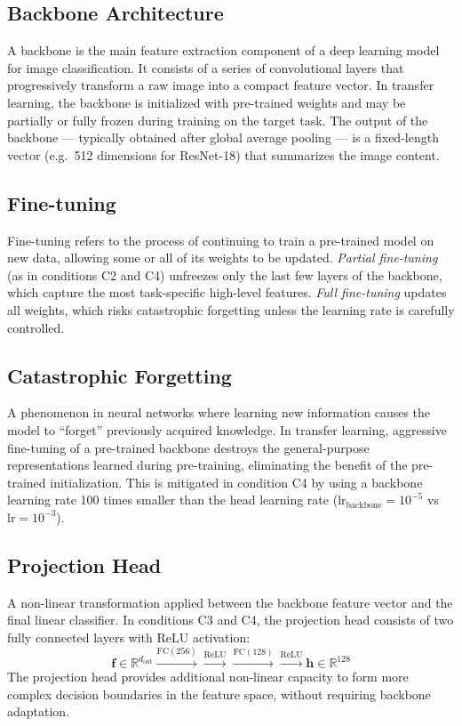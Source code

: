 \documentclass[12pt, a4paper]{article}
\begin{document}
\subsection{Backbone Architecture}

A backbone is the main feature extraction component of a deep learning
model for image classification.
It consists of a series of convolutional layers that progressively
transform a raw image into a compact feature vector.
In transfer learning, the backbone is initialized with pre-trained weights
and may be partially or fully frozen during training on the target task.
The output of the backbone --- typically obtained after global average
pooling --- is a fixed-length vector (e.g.\ 512 dimensions for ResNet-18)
that summarizes the image content.

\subsection{Fine-tuning}

Fine-tuning refers to the process of continuing to train a pre-trained
model on new data, allowing some or all of its weights to be updated.
\textit{Partial fine-tuning} (as in conditions C2 and C4) unfreezes
only the last few layers of the backbone, which capture the most
task-specific high-level features.
\textit{Full fine-tuning} updates all weights, which risks
catastrophic forgetting unless the learning rate is carefully controlled.

\subsection{Catastrophic Forgetting}

A phenomenon in neural networks where learning new information
causes the model to ``forget'' previously acquired knowledge.
In transfer learning, aggressive fine-tuning of a pre-trained backbone
destroys the general-purpose representations learned during pre-training,
eliminating the benefit of the pre-trained initialization.
This is mitigated in condition C4 by using a backbone learning rate
100 times smaller than the head learning rate
($\text{lr}_\text{backbone} = 10^{-5}$ vs $\text{lr} = 10^{-3}$).

\subsection{Projection Head}

A non-linear transformation applied between the backbone feature vector
and the final linear classifier.
In conditions C3 and C4, the projection head consists of two fully
connected layers with ReLU activation:
\[
  \mathbf{f} \in \mathbb{R}^{d_\text{out}}
  \xrightarrow{\text{FC}(256)} \xrightarrow{\text{ReLU}}
  \xrightarrow{\text{FC}(128)} \xrightarrow{\text{ReLU}}
  \mathbf{h} \in \mathbb{R}^{128}
\]
The projection head provides additional non-linear capacity to form
more complex decision boundaries in the feature space, without requiring
backbone adaptation.
\end{document}

